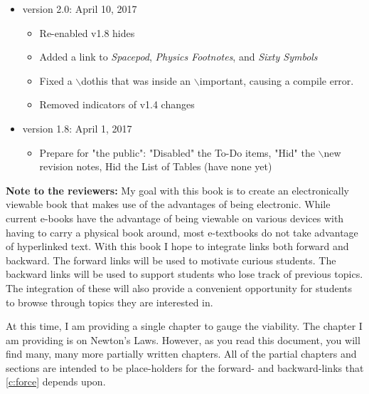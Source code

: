 \documentclass[11pt,letter,openany,makeidx]{book}
\newcommand{\new}[2]{\marginpar{\raggedright \footnotesize New to #1 \\ \fcolorbox{blue}{yellow!10}{\begin{minipage}[c]{1.5in} \center {\color{blue} #2 } \end{minipage}}}}%
\begin{document}
\begin{titlepage}
\begin{ForReviewer}
{\begin{itemize}
        \begin{itemize}
        \item Re-commented the $\backslash$new command
        \item Started the chapters on Seeing Physics [\autoref{c:physics}] and Deeper Dive [\autoref{c:revisted}] (These should be renamed)
        \item Moved some sections on fundamental interactions
        \end{itemize}
    \item version 2.0: April 10, 2017
        \begin{itemize}
        \item Re-enabled v1.8 hides
        \item Added a link to \textit{Spacepod}, \textit{Physics Footnotes}, and \textit{Sixty Symbols}
        \item Fixed a $\backslash$dothis that was inside an $\backslash$important, causing a compile error.
        \item Removed indicators of v1.4 changes
        \end{itemize}
    \item version 1.8: April 1, 2017
        \begin{itemize}
        \item Prepare for "the public": "Disabled" the To-Do items, "Hid" the $\backslash$new revision notes, Hid the List of Tables (have none yet)
        \end{itemize}
    \end{itemize}
    }
\end{ForReviewer}
\begin{ForPublic}
{\flushleft
\textbf{Note to the reviewers:}\new{v1.8}{Added the note}
My goal with this book is to create an electronically viewable book that makes use of the advantages of being electronic.  While current e-books have the advantage of being viewable on various devices with having to carry a physical book around, most e-textbooks do not take advantage of hyperlinked text.  With this book I hope to integrate links both forward and backward.  The forward links will be used to motivate curious students.  The backward links will be used to support students who lose track of previous topics.  The integration of these will also provide a convenient opportunity for students to browse through topics they are interested in.
\newpar

At this time, I am providing a single chapter to gauge the viability.  The chapter I am providing is on Newton's Laws.  However, as you read this document, you will find many, many more partially written chapters.  All of the partial chapters and sections are intended to be place-holders for the forward- and backward-links that \autoref{c:force} depends upon.
\newpar

}
\end{ForPublic}
\end{titlepage}
\end{document}
